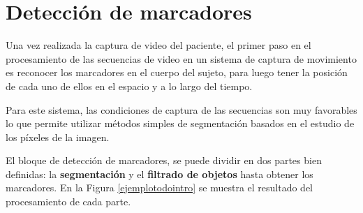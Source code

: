 \section{Detección de marcadores}
Una vez realizada la captura de video del paciente, el primer paso en el procesamiento de las secuencias de video en un sistema de captura de movimiento es reconocer los marcadores en el cuerpo del sujeto, para luego tener la posición de cada uno de ellos en el espacio y a lo largo del tiempo.

Para este sistema, las condiciones de captura de las secuencias son muy favorables lo que permite utilizar métodos simples de segmentación basados en el estudio de los píxeles de la imagen.

El bloque de detección de marcadores, se puede dividir en dos partes bien definidas: la \textbf{segmentación} y el \textbf{filtrado de objetos} hasta obtener los marcadores. En la Figura \ref{ejemplotodointro} se muestra el resultado del procesamiento de cada parte.

